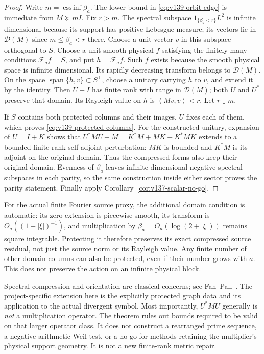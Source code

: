 \documentclass[11pt]{article}
\theoremstyle{remark}
\newcommand{\ip}[2]{\left\langle #1,#2\right\rangle}
\begin{document}
\begin{proof}
Write $m=\operatorname*{ess\,inf}\beta_a$. The lower bound in
\eqref{eq:v139-orbit-edge} is immediate from $M\succeq mI$.
Fix $r>m$. The spectral subspace $1_{\{\beta_a<r\}}L^2$ is
infinite dimensional because its support has positive Lebesgue measure;
its vectors lie in $\mathcal D(M)$ since $m\le\beta_a<r$ there.
Choose a unit vector $v$ in this subspace orthogonal to $S$.
Choose a unit smooth physical $f$ satisfying the finitely many
conditions $\mathcal F_af\perp S$, and put $h=\mathcal F_af$.
Such $f$ exists because the smooth physical space is infinite
dimensional. Its rapidly decreasing transform belongs to
$\mathcal D(M)$. On the space $\operatorname{span}\{h,v\}\subset
S^\perp$, choose a unitary carrying $h$ to $v$, and extend it by the
identity. Then $U-I$ has finite rank with range in $\mathcal D(M)$;
both $U$ and $U^*$ preserve that domain. Its Rayleigh value on $h$
is $\ip{Mv}v<r$. Let $r\downarrow m$.

If $S$ contains both protected columns and their images, $U$ fixes
each of them, which proves \eqref{eq:v139-protected-columns}.
For the constructed unitary, expansion of $U=I+K$ shows that
$U^*MU-M=K^*M+MK+K^*MK$ extends to a bounded finite-rank
self-adjoint perturbation: $MK$ is bounded and $K^*M$ is its
adjoint on the original domain. Thus the compressed forms also
keep their original domain. Evenness of $\beta_a$ leaves infinite
dimensional negative spectral subspaces in each parity, so the same
construction inside either sector proves the parity statement.
Finally apply Corollary~\ref{cor:v137-scalar-no-go}.
\end{proof}

For the actual finite Fourier source proxy, the additional domain
condition is automatic: its zero extension is piecewise smooth,
its transform is $O_a((1+|\xi|)^{-1})$, and multiplication by
$\beta_a=O_a(\log(2+|\xi|))$ remains square integrable. Protecting
it therefore preserves its exact compressed source residual, not
just the source norm or its Rayleigh value. Any finite number of
other domain columns can also be protected, even if their number
grows with $a$. This does not preserve the action on an infinite
physical block.

Spectral compression and orientation are classical concerns; see
Fan--Pall~\cite{FanPall1957}. The project-specific extension here is
the explicitly protected graph data and its application to the
actual divergent symbol. Most importantly, $U^*MU$ generally is
\emph{not} a multiplication operator. The theorem rules out bounds
required to be valid on that larger operator class. It does not
construct a rearranged prime sequence, a negative arithmetic Weil
test, or a no-go for methods retaining the multiplier's physical
support geometry. It is not a new finite-rank metric repair.
\end{document}
